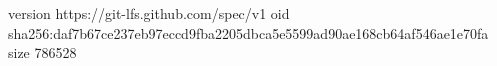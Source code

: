 version https://git-lfs.github.com/spec/v1
oid sha256:daf7b67ce237eb97eccd9fba2205dbca5e5599ad90ae168cb64af546ae1e70fa
size 786528
